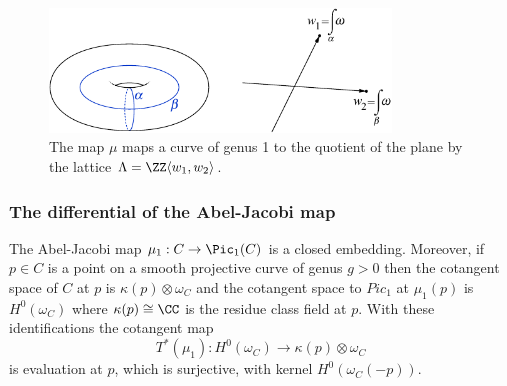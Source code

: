 %

\begin{figure}[htbp]
\inprogress
\centerline {\includegraphics[height=1.3in]{"main/Fig04-3"}}
 \caption{The map $\mu$ maps a curve of genus 1 to the quotient of the plane by the lattice $\Lambda = \ZZ\langle w_1,w_2\rangle$.}
\end{figure}

\subsubsection{The differential of the Abel-Jacobi map}\label{Abel-Jacobi differential}


\begin{theorem}
The Abel-Jacobi map $\mu_{1}: C\to \Pic_{1}(C)$ is a closed embedding. Moreover, if $p\in C$ is a point on a smooth projective curve of genus $g>0$ then the cotangent space of $C$
at $p$ is $\kappa(p) \otimes \omega_{C}$ and the cotangent space to $Pic_{1}$ at $\mu_{1}(p)$ is
$H^{0}(\omega_{C})$ where $\kappa(p) \cong \CC$ is the residue class field at $p$. With these identifications the cotangent map
$$
T^{*}(\mu_{1}): H^{0}(\omega_{C})  \to \kappa(p) \otimes \omega_{C}
$$
is evaluation at $p$, which is surjective, with kernel 
$H^{0}(\omega_{C}(-p))$. 
\end{theorem}


